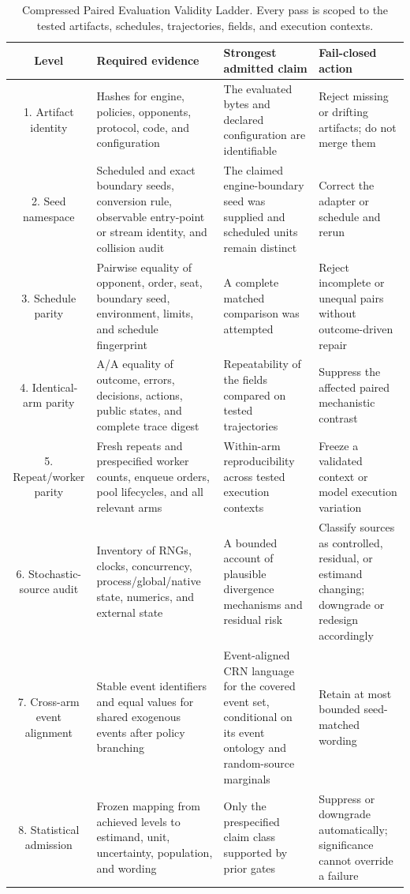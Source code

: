 \documentclass[aps,reprint,superscriptaddress,longbibliography,floatfix]{revtex4-2}
\begin{document}
\begin{table}[t]
\caption{Compressed Paired Evaluation Validity Ladder.  Every pass is scoped to
the tested artifacts, schedules, trajectories, fields, and execution contexts.}
\label{tab:pevl}
\footnotesize
\begin{ruledtabular}
\begin{tabularx}{\textwidth}{c>{\raggedright\arraybackslash}X>{\raggedright\arraybackslash}X>{\raggedright\arraybackslash}X}
Level & Required evidence & Strongest admitted claim & Fail-closed action \\
\hline
1. Artifact identity & Hashes for engine, policies, opponents, protocol, code, and configuration & The evaluated bytes and declared configuration are identifiable & Reject missing or drifting artifacts; do not merge them \\
2. Seed namespace & Scheduled and exact boundary seeds, conversion rule, observable entry-point or stream identity, and collision audit & The claimed engine-boundary seed was supplied and scheduled units remain distinct & Correct the adapter or schedule and rerun \\
3. Schedule parity & Pairwise equality of opponent, order, seat, boundary seed, environment, limits, and schedule fingerprint & A complete matched comparison was attempted & Reject incomplete or unequal pairs without outcome-driven repair \\
4. Identical-arm parity & A/A equality of outcome, errors, decisions, actions, public states, and complete trace digest & Repeatability of the fields compared on tested trajectories & Suppress the affected paired mechanistic contrast \\
5. Repeat/worker parity & Fresh repeats and prespecified worker counts, enqueue orders, pool lifecycles, and all relevant arms & Within-arm reproducibility across tested execution contexts & Freeze a validated context or model execution variation \\
6. Stochastic-source audit & Inventory of RNGs, clocks, concurrency, process/global/native state, numerics, and external state & A bounded account of plausible divergence mechanisms and residual risk & Classify sources as controlled, residual, or estimand changing; downgrade or redesign accordingly \\
7. Cross-arm event alignment & Stable event identifiers and equal values for shared exogenous events after policy branching & Event-aligned CRN language for the covered event set, conditional on its event ontology and random-source marginals & Retain at most bounded seed-matched wording \\
8. Statistical admission & Frozen mapping from achieved levels to estimand, unit, uncertainty, population, and wording & Only the prespecified claim class supported by prior gates & Suppress or downgrade automatically; significance cannot override a failure \\
\end{tabularx}
\end{ruledtabular}
\end{table}
\end{document}
